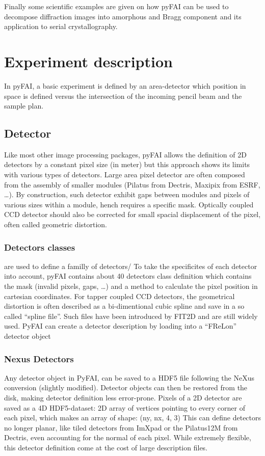\documentclass[preprint]{iucr}
\begin{document}
Finally some scientific examples are given on how pyFAI can be used to decompose 
diffraction images into amorphous and Bragg component and its application
to serial crystallography.
 
\section{Experiment description}
In pyFAI, a basic experiment is defined by an area-detector which position in
space is defined versus the intersection of the incoming pencil beam and the
sample plan.

\subsection{Detector}
Like most other image processing packages, pyFAI allows the definition of 2D
detectors by a constant pixel size (in meter) but this approach shows its limits
with various types of detectors.
Large area pixel detector are often composed from the assembly of smaller
modules (Pilatus from Dectris, Maxipix from ESRF, \ldots). 
By construction, such detector exhibit gaps between modules and pixels of
various sizes within a module, hench requires a specific mask.
Optically coupled CCD detector should also be corrected
for small spacial displacement of the pixel, often called geometric distortion.

\subsubsection{Detectors classes} are used to define a familly of detectors/ 
To take the specificites of each detector into account, pyFAI contains about
40 detectors class definition which contains the mask (invalid pixels, gaps,
\ldots) and a method to calculate the pixel position in cartesian coordinates.
For tapper coupled CCD detectors, the geometrical distortion is often
described as a bi-dimentional cubic spline and save in a so called ``spline
file''. 
Such files have been introduced by FIT2D \cite{fit2d} and are still widely
used. PyFAI can create a detector description by loading into a ``FReLon''
detector object

\subsubsection{Nexus Detectors}
Any detector object in PyFAI, can be saved to a HDF5 file following the NeXus
conversion (slightly modified).
Detector objects can then be restored from the disk, making detector definition
less error-prone.
Pixels of a 2D detector are saved as a 4D HDF5-dataset: 2D array of vertices
pointing to every corner of each pixel, which makes an array of shape: (ny, nx, 4, 3)
This can define detectors no longer planar, like tiled detectors from
ImXpad or the Pilatus12M from Dectris, even accounting for the normal of each
pixel. 
While extremely flexible, this detector definition come at the cost of
large description files.
\end{document}
